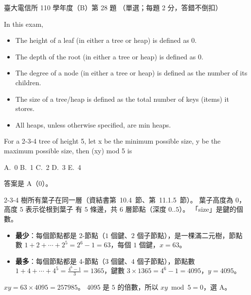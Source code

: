 \begin{pastexam}[label={px:ntu-110-comm-dsa-28}]{臺大電信所 110 學年度（B）第 28 題}
（單選；每題 2 分，答錯不倒扣）

In this exam,
\begin{itemize}
\item The height of a leaf (in either a tree or heap) is defined as 0.
\item The depth of the root (in either a tree or heap) is defined as 0.
\item The degree of a node (in either a tree or heap) is defined as the number of its children.
\item The size of a tree/heap is defined as the total number of keys (items) it stores.
\item All heaps, unless otherwise specified, are min heaps.
\end{itemize}

For a 2-3-4 tree of height 5, let x be the minimum possible size, y be the maximum possible size, then (xy) mod 5 is

A.~0 \qquad B.~1 \qquad C.~2 \qquad D.~3 \qquad E.~4
\end{pastexam}

\begin{pastsoln}
答案是 A（0）。

2-3-4 樹所有葉子在同一層（資結書第~10.4~節、第~11.1.5~節）。 葉子高度為 $0$，高度 $5$ 表示從根到葉子
有 $5$ 條邊，共 $6$ 層節點（深度 $0..5$）。 「size」是鍵的個數。
\begin{itemize}
\item \textbf{最少}：每個節點都是 2-節點（$1$ 個鍵、$2$ 個子節點），是一棵滿二元樹，節點數
$1 + 2 + \cdots + 2^5 = 2^6 - 1 = 63$，每個 $1$ 個鍵，$x = 63$。
\item \textbf{最多}：每個節點都是 4-節點（$3$ 個鍵、$4$ 個子節點），節點數
$1 + 4 + \cdots + 4^5 = \tfrac{4^6 - 1}{3} = 1365$，鍵數 $3 \times 1365 = 4^6 - 1 = 4095$，$y = 4095$。
\end{itemize}
$xy = 63 \times 4095 = 257985$。 $4095$ 是 $5$ 的倍數，所以 $xy \bmod 5 = 0$，選 A。
\end{pastsoln}
